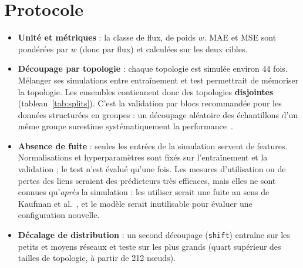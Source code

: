 \documentclass[11pt,a4paper]{report}
\begin{document}
\section{Protocole}
\begin{itemize}
  \item \textbf{Unité et métriques} : la classe de flux, de poids $w$. MAE et MSE sont pondérées par $w$ (donc par flux) et calculées sur les deux cibles.
  \item \textbf{Découpage par topologie} : chaque topologie est simulée environ 44 fois. Mélanger ses simulations entre entraînement et test permettrait de mémoriser la topologie. Les ensembles contiennent donc des topologies \textbf{disjointes} (tableau~\ref{tab:splits}). C'est la validation par blocs recommandée pour les données structurées en groupes : un découpage aléatoire des échantillons d'un même groupe surestime systématiquement la performance~\cite{roberts}.
  \item \textbf{Absence de fuite} : seules les entrées de la simulation servent de features. Normalisations et hyperparamètres sont fixés sur l'entraînement et la validation ; le test n'est évalué qu'une fois. Les mesures d'utilisation ou de pertes des liens seraient des prédicteurs très efficaces, mais elles ne sont connues qu'\emph{après} la simulation : les utiliser serait une fuite au sens de Kaufman et al.~\cite{kaufman}, et le modèle serait inutilisable pour évaluer une configuration nouvelle.
  \item \textbf{Décalage de distribution} : un second découpage (\texttt{shift}) entraîne sur les petits et moyens réseaux et teste sur les plus grands (quart supérieur des tailles de topologie, à partir de 212 nœuds).
\end{itemize}
\begin{table}[H]
\centering\small
{}
\caption{Découpages train / validation / test (topologies disjointes).}
\label{tab:splits}
\end{table}

\end{document}
